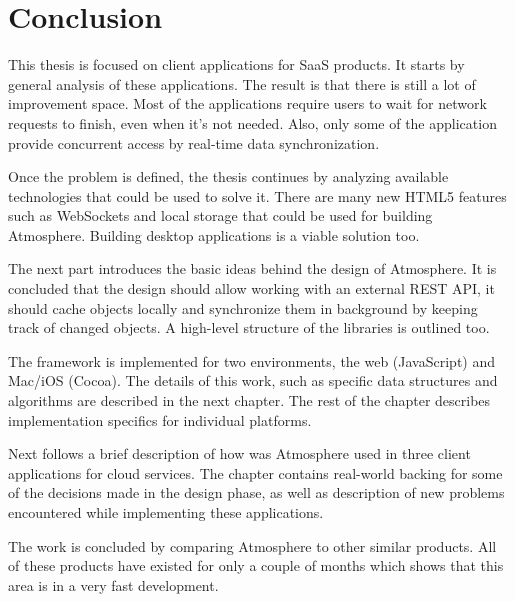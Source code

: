 \section{Conclusion}

This thesis is focused on client applications for SaaS products. It starts by general analysis of these applications. The result is that there is still a lot of improvement space. Most of the applications require users to wait for network requests to finish, even when it's not needed. Also, only some of the application provide concurrent access by real-time data synchronization.

Once the problem is defined, the thesis continues by analyzing available technologies that could be used to solve it. There are many new HTML5 features such as WebSockets and local storage that could be used for building Atmosphere. Building desktop applications is a viable solution too.

The next part introduces the basic ideas behind the design of Atmosphere. It is concluded that the design should allow working with an external REST API, it should cache objects locally and synchronize them in background by keeping track of changed objects. A high-level structure of the libraries is outlined too.

The framework is implemented for two environments, the web (JavaScript) and Mac/iOS (Cocoa). The details of this work, such as specific data structures and algorithms are described in the next chapter. The rest of the chapter describes implementation specifics for individual platforms.

Next follows a brief description of how was Atmosphere used in three client applications for cloud services. The chapter contains real-world backing for some of the decisions made in the design phase, as well as description of new problems encountered while implementing these applications.

The work is concluded by comparing Atmosphere to other similar products. All of these products have existed for only a couple of months which shows that this area is in a very fast development.